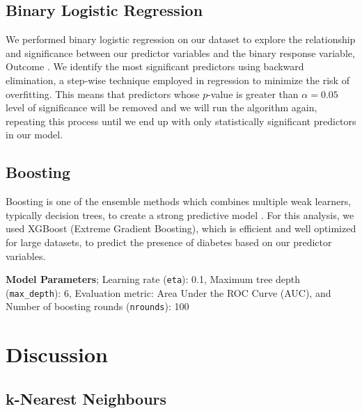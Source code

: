 \documentclass[12pt]{article}
\begin{document}
\subsection{Binary Logistic Regression}

\begin{indent}
\onehalfspacing
	
We performed binary logistic regression on our dataset to explore the relationship and significance between our predictor variables and the binary response variable, Outcome \citep{faraway2016extending}. We identify the most significant predictors using backward elimination, a step-wise technique employed in regression to minimize the risk of overfitting. This means that predictors whose $p$-value is greater than $\alpha = 0.05$ level of significance will be removed and we will run the algorithm again, repeating this process until we end up with only statistically significant predictors in our model.
\end{indent}

\subsection{Boosting}

\begin{indent}
\onehalfspacing
	
Boosting is one of the ensemble methods which combines multiple weak learners, typically decision trees, to create a strong predictive model \citep{chen2015xgboost,friedman2001greedy}. For this analysis, we used XGBoost (Extreme Gradient Boosting), which is efficient and well optimized for large datasets, to predict the presence of diabetes based on our predictor variables. 
\end{indent}

\textbf{Model Parameters}; Learning rate (\texttt{eta}): 0.1, Maximum tree depth (\texttt{max\_depth}): 6, Evaluation metric: Area Under the ROC Curve (AUC), and Number of boosting rounds (\texttt{nrounds}): 100

\section{Discussion}

\subsection{k-Nearest Neighbours}

\indent
\onehalfspacing
\end{document}
